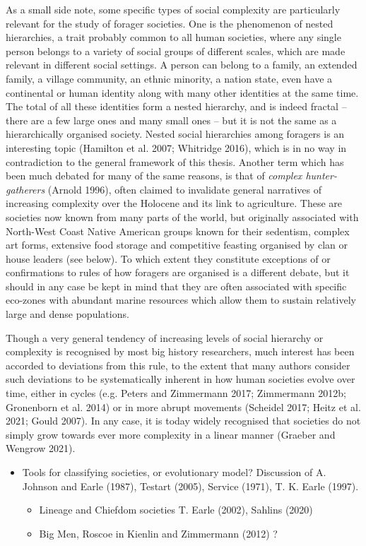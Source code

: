 \documentclass[
  12pt,
  a4paper, twoside]{book}
\providecommand{\tightlist}{%
  \setlength{\itemsep}{0pt}\setlength{\parskip}{0pt}}
\begin{document}
As a small side note, some specific types of social complexity are particularly relevant for the study of forager societies. One is the phenomenon of nested hierarchies, a trait probably common to all human societies, where any single person belongs to a variety of social groups of different scales, which are made relevant in different social settings. A person can belong to a family, an extended family, a village community, an ethnic minority, a nation state, even have a continental or human identity along with many other identities at the same time. The total of all these identities form a nested hierarchy, and is indeed fractal -- there are a few large ones and many small ones -- but it is not the same as a hierarchically organised society. Nested social hierarchies among foragers is an interesting topic (Hamilton et al. 2007; Whitridge 2016), which is in no way in contradiction to the general framework of this thesis. Another term which has been much debated for many of the same reasons, is that of \emph{complex hunter-gatherers} (Arnold 1996), often claimed to invalidate general narratives of increasing complexity over the Holocene and its link to agriculture. These are societies now known from many parts of the world, but originally associated with North-West Coast Native American groups known for their sedentism, complex art forms, extensive food storage and competitive feasting organised by clan or house leaders (see below). To which extent they constitute exceptions of or confirmations to rules of how foragers are organised is a different debate, but it should in any case be kept in mind that they are often associated with specific eco-zones with abundant marine resources which allow them to sustain relatively large and dense populations.

Though a very general tendency of increasing levels of social hierarchy or complexity is recognised by most big history researchers, much interest has been accorded to deviations from this rule, to the extent that many authors consider such deviations to be systematically inherent in how human societies evolve over time, either in cycles (e.g. Peters and Zimmermann 2017; Zimmermann 2012b; Gronenborn et al. 2014) or in more abrupt movements (Scheidel 2017; Heitz et al. 2021; Gould 2007). In any case, it is today widely recognised that societies do not simply grow towards ever more complexity in a linear manner (Graeber and Wengrow 2021).

\begin{itemize}
\item
  Tools for classifying societies, or evolutionary model? Discussion of A. Johnson and Earle (1987), Testart (2005), Service (1971), T. K. Earle (1997).

  \begin{itemize}
  \tightlist
  \item
    Lineage and Chiefdom societies T. Earle (2002), Sahlins (2020)
  \item
    Big Men, Roscoe in Kienlin and Zimmermann (2012) ?
  \end{itemize}
\end{itemize}
\end{document}
